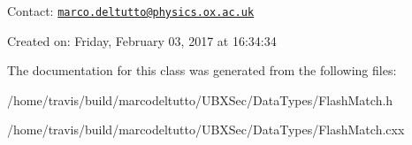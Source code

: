 \-Contact\-: \href{mailto:marco.deltutto@physics.ox.ac.uk}{\tt marco.\-deltutto@physics.\-ox.\-ac.\-uk}

\-Created on\-: \-Friday, \-February 03, 2017 at 16\-:34\-:34 

\-The documentation for this class was generated from the following files\-:\begin{DoxyCompactItemize}
\item 
/home/travis/build/marcodeltutto/\-U\-B\-X\-Sec/\-Data\-Types/\-Flash\-Match.\-h\item 
/home/travis/build/marcodeltutto/\-U\-B\-X\-Sec/\-Data\-Types/\-Flash\-Match.\-cxx\end{DoxyCompactItemize}
